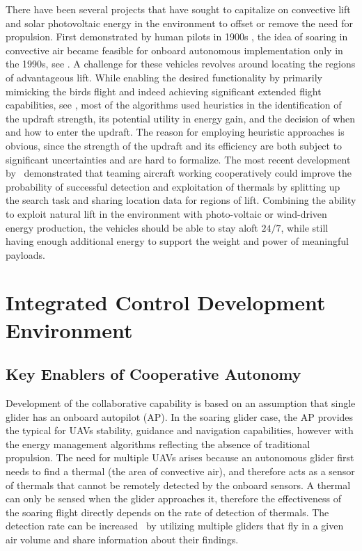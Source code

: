 \documentclass[letterpaper, 10 pt, conference]{ieeeconf}  %
\begin{document}
There have been several projects that have sought to capitalize on convective lift and solar photovoltaic energy in the environment to offset or remove the need for propulsion. First demonstrated by human pilots in 1900s \cite{Simons:1998}, the idea of soaring in convective air became feasible for onboard autonomous implementation only in the 1990s, see \cite{Wharington:1998}. A challenge for these vehicles revolves around locating the regions of advantageous lift. While enabling the desired functionality by primarily mimicking the birds flight and indeed achieving significant extended flight capabilities, see \cite{Edwards:2008,Allen:2006,Allen:2007}, most of the algorithms used heuristics in the identification of the updraft strength, its potential utility in energy gain, and the decision of when and how to enter the updraft. The reason for employing heuristic approaches is obvious, since the strength of the updraft and its efficiency are both subject to significant uncertainties and are hard to formalize. The most recent development by~\cite{AKlass_CDC:2012,AKlass_JGCD:2012} demonstrated that teaming aircraft working cooperatively could improve the probability of successful detection and exploitation of thermals by splitting up the search task and sharing location data for regions of lift. Combining the ability to exploit natural lift in the environment with photo-voltaic or wind-driven energy production, the vehicles should be able to stay aloft $24/7$, while still having enough additional energy to support the weight and power of meaningful payloads.


\section{Integrated Control Development Environment}

\subsection{Key Enablers of Cooperative Autonomy}

Development of the collaborative capability is based on an assumption that single glider has an onboard autopilot (AP). In the soaring glider case, the AP provides the typical for UAVs stability, guidance and navigation capabilities, however with the energy management algorithms reflecting the absence of traditional propulsion. The need for multiple UAVs arises because an autonomous glider first needs to find a thermal (the area of convective air), and therefore acts as a sensor of thermals that cannot be remotely detected by the onboard sensors. A thermal can only be sensed when the glider approaches it, therefore the effectiveness of the soaring flight directly depends on the rate of detection of thermals. The detection rate can be increased~\cite{AKlass_JGCD:2012} by utilizing multiple gliders that fly in a given air volume and share information about their findings.
\end{document}
